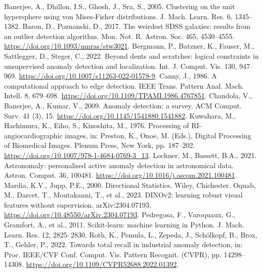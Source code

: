 \documentclass[final,5p,times,twocolumn,authoryear]{elsarticle}
\begin{document}
\begin{thebibliography}{}
\footnotesize
{} Banerjee, A., Dhillon, I.S., Ghosh, J., Sra, S., 2005. Clustering on the unit hypersphere using von Mises-Fisher distributions. J. Mach. Learn. Res. 6, 1345--1382.
 Baron, D., Poznanski, D., 2017. The weirdest SDSS galaxies: results from an outlier detection algorithm. Mon. Not. R. Astron. Soc. 465, 4530--4555. \url{https://doi.org/10.1093/mnras/stw3021}.
 Bergmann, P., Batzner, K., Fauser, M., Sattlegger, D., Steger, C., 2022. Beyond dents and scratches: logical constraints in unsupervised anomaly detection and localization. Int. J. Comput. Vis. 130, 947--969. \url{https://doi.org/10.1007/s11263-022-01578-9}.
 Canny, J., 1986. A computational approach to edge detection. IEEE Trans. Pattern Anal. Mach. Intell. 8, 679--698. \url{https://doi.org/10.1109/TPAMI.1986.4767851}.
 Chandola, V., Banerjee, A., Kumar, V., 2009. Anomaly detection: a survey. ACM Comput. Surv. 41 (3), 15. \url{https://doi.org/10.1145/1541880.1541882}.
 Kuwahara, M., Hachimura, K., Eiho, S., Kinoshita, M., 1976. Processing of RI-angiocardiographic images, in: Preston, K., Onoe, M. (Eds.), Digital Processing of Biomedical Images. Plenum Press, New York, pp. 187--202. \url{https://doi.org/10.1007/978-1-4684-0769-3_13}.
 Lochner, M., Bassett, B.A., 2021. Astronomaly: personalised active anomaly detection in astronomical data. Astron. Comput. 36, 100481. \url{https://doi.org/10.1016/j.ascom.2021.100481}.
 Mardia, K.V., Jupp, P.E., 2000. Directional Statistics. Wiley, Chichester.
 Oquab, M., Darcet, T., Moutakanni, T., et al., 2023. DINOv2: learning robust visual features without supervision. arXiv:2304.07193. \url{https://doi.org/10.48550/arXiv.2304.07193}.
 Pedregosa, F., Varoquaux, G., Gramfort, A., et al., 2011. Scikit-learn: machine learning in Python. J. Mach. Learn. Res. 12, 2825--2830.
 Roth, K., Pemula, L., Zepeda, J., Sch{\"o}lkopf, B., Brox, T., Gehler, P., 2022. Towards total recall in industrial anomaly detection, in: Proc. IEEE/CVF Conf. Comput. Vis. Pattern Recognit. (CVPR), pp. 14298--14308. \url{https://doi.org/10.1109/CVPR52688.2022.01392}.

\end{thebibliography}
\end{document}
